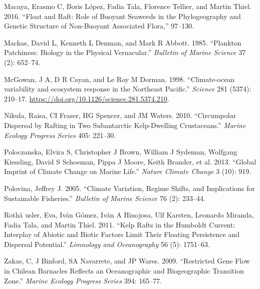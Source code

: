 \documentclass[
]{article}
\begin{document}
\leavevmode\hypertarget{ref-macaya2016}{}%
Macaya, Erasmo C, Boris López, Fadia Tala, Florence Tellier, and Martin
Thiel. 2016. ``Float and Raft: Role of Buoyant Seaweeds in the
Phylogeography and Genetic Structure of Non-Buoyant Associated Flora,''
97--130.

\leavevmode\hypertarget{ref-mackas1985}{}%
Mackas, David L, Kenneth L Denman, and Mark R Abbott. 1985. ``Plankton
Patchiness: Biology in the Physical Vernacular.'' \emph{Bulletin of
Marine Science} 37 (2): 652--74.

\leavevmode\hypertarget{ref-McGowan1998}{}%
McGowan, J A, D R Cayan, and Le Roy M Dorman. 1998. ``Climate-ocean
variability and ecosystem response in the Northeast Pacific.''
\emph{Science} 281 (5374): 210--17.
\url{https://doi.org/10.1126/science.281.5374.210}.

\leavevmode\hypertarget{ref-nikula2010}{}%
Nikula, Raisa, CI Fraser, HG Spencer, and JM Waters. 2010. ``Circumpolar
Dispersal by Rafting in Two Subantarctic Kelp-Dwelling Crustaceans.''
\emph{Marine Ecology Progress Series} 405: 221--30.

\leavevmode\hypertarget{ref-Poloczanska2013}{}%
Poloczanska, Elvira S, Christopher J Brown, William J Sydeman, Wolfgang
Kiessling, David S Schoeman, Pippa J Moore, Keith Brander, et al. 2013.
``Global Imprint of Climate Change on Marine Life.'' \emph{Nature
Climate Change} 3 (10): 919.

\leavevmode\hypertarget{ref-Polovina2005}{}%
Polovina, Jeffrey J. 2005. ``Climate Variation, Regime Shifts, and
Implications for Sustainable Fisheries.'' \emph{Bulletin of Marine
Science} 76 (2): 233--44.

\leavevmode\hypertarget{ref-rotha2011}{}%
Rothä usler, Eva, Iván Gómez, Iván A Hinojosa, Ulf Karsten, Leonardo
Miranda, Fadia Tala, and Martin Thiel. 2011. ``Kelp Rafts in the
Humboldt Current: Interplay of Abiotic and Biotic Factors Limit Their
Floating Persistence and Dispersal Potential.'' \emph{Limnology and
Oceanography} 56 (5): 1751--63.

\leavevmode\hypertarget{ref-zakas2009}{}%
Zakas, C, J Binford, SA Navarrete, and JP Wares. 2009. ``Restricted Gene
Flow in Chilean Barnacles Reflects an Oceanographic and Biogeographic
Transition Zone.'' \emph{Marine Ecology Progress Series} 394: 165--77.
\end{document}
